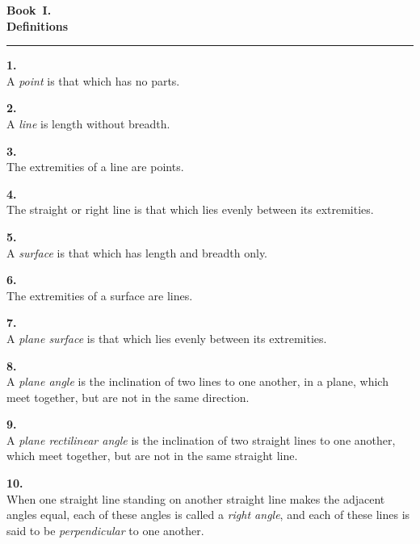\documentclass[12pt]{article}
\newcommand{\deftext}[2]{%
  \vspace{0.35cm}%
  \begin{center}%
    \textbf{#1.}\\[2pt]%
    #2%
  \end{center}%
}
\newcommand{\deffig}[2]{%
  \vspace{0.35cm}%
  \noindent%
  \begin{minipage}[t]{0.34\linewidth}%
    \vspace{0pt}\centering%
    \drawCurrentPicture%
  \end{minipage}\hfill%
  \begin{minipage}[t]{0.62\linewidth}%
    \vspace{0pt}\centering%
    \textbf{#1.}\\[4pt]%
    #2%
  \end{minipage}%
  \vspace{0.1cm}%
}
\begin{document}
\begin{center}
  {\large\textbf{Book~I.}}\\[4pt]
  {\Large\textbf{Definitions}}
\end{center}

\vspace{0.4cm}
\noindent\rule{\linewidth}{0.4pt}
\vspace{0.2cm}


\deftext{1}{A \emph{point} is that which has no parts.}

\deftext{2}{A \emph{line} is length without breadth.}

\deftext{3}{The extremities of a line are points.}

\deftext{4}{The straight or right line is that which lies evenly between its extremities.}

\deftext{5}{A \emph{surface} is that which has length and breadth only.}

\deftext{6}{The extremities of a surface are lines.}

\deftext{7}{A \emph{plane surface} is that which lies evenly between its extremities.}

\deftext{8}{A \emph{plane angle} is the inclination of two lines to one another,
in a plane, which meet together, but are not in the same direction.}

\deffig{9}{A \emph{plane rectilinear angle} is the inclination of two straight lines
to one another, which meet together, but are not in the same straight line.}

\deffig{10}{When one straight line standing on another straight line makes the
adjacent angles equal, each of these angles is called a \emph{right angle},
and each of these lines is said to be \emph{perpendicular} to one another.}
\end{document}
